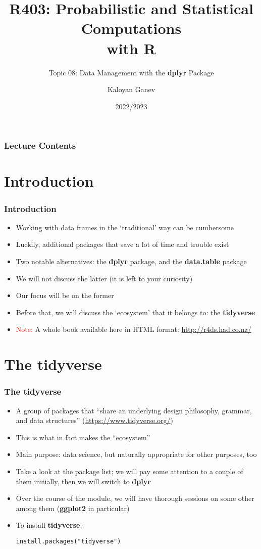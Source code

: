 \documentclass[10pt]{beamer}
\title{R403: Probabilistic and Statistical Computations\\ with R}
\subtitle{Topic 08: \textcolor{myred}{Data Management with the \textbf{dplyr} Package}}
\author{Kaloyan Ganev}
\date{2022/2023}
\theoremstyle{definition}
\begin{document}
\maketitle

\begin{frame}[fragile]
\frametitle{Lecture Contents}
\tableofcontents
\end{frame}

\section{Introduction}
\begin{frame}[fragile]
\frametitle{Introduction}
\begin{itemize}
	\item Working with data frames in the `traditional' way can be cumbersome
	\item Luckily, additional packages that save a lot of time and trouble exist
	\item Two notable alternatives: the \textbf{dplyr} package, and the \textbf{data.table} package
	\item We will not discuss the latter (it is left to your curiosity)
	\item Our focus will be on the former
	\item Before that, we will discuss the `ecosystem' that it belongs to: the \textbf{tidyverse}
	\item \textcolor{red}{Note:} A whole book available here in HTML format: \url{http://r4ds.had.co.nz/}
\end{itemize}
\end{frame}

\section{The tidyverse}
\begin{frame}[fragile]
\frametitle{The \textbf{tidyverse}}
\begin{itemize}
	\item A group of packages that ``share an underlying design philosophy, grammar, and data structures'' (\url{https://www.tidyverse.org/})
	\item This is what in fact makes the ``ecosystem''
	\item Main purpose: data science, but naturally appropriate for other purposes, too
	\item Take a look at the package list; we will pay some attention to a couple of them initially, then we will switch to \textbf{dplyr}
	\item Over the course of the module, we will have thorough sessions on some other among them (\textbf{ggplot2} in particular)
	\item To install \textbf{tidyverse}:
	\begin{lstlisting}[style = rstyle]
	install.packages("tidyverse")
	\end{lstlisting}
\end{itemize}
\end{frame}
\end{document}

